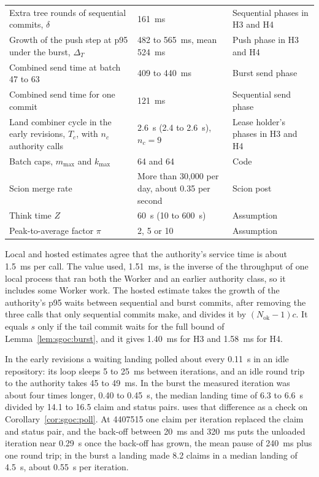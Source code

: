 \documentclass[11pt,letterpaper]{article}
\theoremstyle{definition}
\theoremstyle{remark}
\begin{document}
\begin{table}[t]
\begin{tabularx}{\textwidth}{@{}L{5.4cm}L{3.3cm}Y@{}}
Extra tree rounds of sequential commits, $\delta$ & 161~ms & Sequential phases in H3 and H4 \\ %
Growth of the push step at p95 under the burst, $\Delta_T$ & 482 to 565~ms, mean 524~ms & Push phase in H3 and H4 \\ %
Combined send time at batch 47 to 63 & 409 to 440~ms & Burst send phase \\ %
Combined send time for one commit & 121~ms & Sequential send phase \\ %
Land combiner cycle in the early revisions, $T_c$, with $n_c$ authority calls & 2.6~s (2.4 to 2.6~s), $n_c = 9$ & Lease holder's phases in H3 and H4 \\ %
Batch caps, $m_{\max}$ and $k_{\max}$ & 64 and 64 & Code \\
Scion merge rate & More than 30,000 per day, about 0.35 per second & Scion post \cite{anthropic2026scion} \\ %
Think time $Z$ & 60~s (10 to 600~s) & Assumption \\
Peak-to-average factor $\pi$ & 2, 5 or 10 & Assumption \\
\bottomrule
\end{tabularx}
\end{table}

Local and hosted estimates agree that the authority's service time is about 1.5~ms per call. The value used, 1.51~ms, is the inverse of the throughput of one local process that ran both the Worker and an earlier authority class, so it includes some Worker work. %
The hosted estimate takes the growth of the authority's p95 waits between sequential and burst commits, after removing the three calls that only sequential commits make, and divides it by $(N_{\mathrm{ok}} - 1)c$. It equals $s$ only if the tail commit waits for the full bound of Lemma~\ref{lem:sgoc:burst}, and it gives 1.40~ms for H3 and 1.58~ms for H4. %

In the early revisions a waiting landing polled about every 0.11~s in an idle repository: its loop sleeps 5 to 25~ms between iterations, and an idle round trip to the authority takes 45 to 49~ms. %
In the burst the measured iteration was about four times longer, 0.40 to 0.45~s, the median landing time of 6.3 to 6.6~s divided by 14.1 to 16.5 claim and status pairs. %
 uses that difference as a check on Corollary~\ref{cor:sgoc:poll}. At 4407515 one claim per iteration replaced the claim and status pair, and the back-off between 20~ms and 320~ms puts the unloaded iteration near 0.29~s once the back-off has grown, the mean pause of 240~ms plus one round trip; in the burst a landing made 8.2 claims in a median landing of 4.5~s, about 0.55~s per iteration. %
\end{document}
